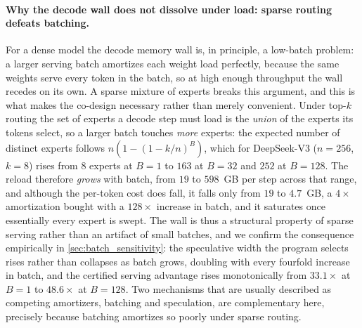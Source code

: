 \paragraph{Why the decode wall does not dissolve under load: sparse routing defeats batching.}
For a dense model the decode memory wall is, in principle, a low-batch problem:
a larger serving batch amortizes each weight load perfectly, because the same
weights serve every token in the batch, so at high enough throughput the wall
recedes on its own. A sparse mixture of experts breaks this argument, and this
is what makes the co-design necessary rather than merely convenient. Under
top-$k$ routing the set of experts a decode step must load is the \emph{union}
of the experts its tokens select, so a larger batch touches \emph{more} experts:
the expected number of distinct experts follows $n(1-(1-k/n)^{B})$, which for
DeepSeek-V3 ($n=256$, $k=8$) rises from $8$ experts at $B=1$ to $163$ at
$B=32$ and $252$ at $B=128$. The reload therefore \emph{grows} with batch,
from $19$ to $598$~GB per step across that range, and although the per-token
cost does fall, it falls only from $19$ to $4.7$~GB, a $4\times$ amortization
bought with a $128\times$ increase in batch, and it saturates once essentially
every expert is swept. The wall is thus a structural property of sparse serving
rather than an artifact of small batches, and we confirm the consequence
empirically in \cref{sec:batch_sensitivity}: the speculative width the program
selects rises rather than collapses as batch grows, doubling with every
fourfold increase in batch, and the certified serving advantage rises
monotonically from $33.1\times$ at $B=1$ to $48.6\times$ at $B=128$. Two
mechanisms that are usually described as competing amortizers, batching and
speculation, are complementary here, precisely because batching amortizes so
poorly under sparse routing.

